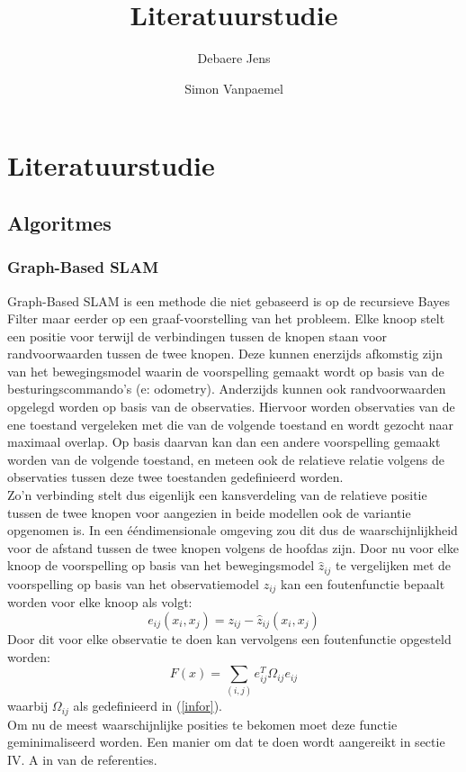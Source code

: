 \documentclass{book}
\title{Literatuurstudie}
\author{Debaere Jens \and Simon Vanpaemel}
\begin{document}
\chapter{Literatuurstudie}
\section{Algoritmes}
\subsection{Graph-Based SLAM}
Graph-Based SLAM is een methode die niet gebaseerd is op de recursieve Bayes Filter maar eerder op een graaf-voorstelling van het probleem. Elke knoop stelt een positie voor terwijl de verbindingen tussen de knopen staan voor randvoorwaarden tussen de twee knopen. Deze kunnen enerzijds afkomstig zijn van het bewegingsmodel waarin de voorspelling gemaakt wordt op basis van de besturingscommando's (e: odometry). Anderzijds kunnen ook randvoorwaarden opgelegd worden op basis van de observaties. Hiervoor worden observaties van de ene toestand vergeleken met die van de volgende toestand en wordt gezocht naar maximaal overlap. Op basis daarvan kan dan een andere voorspelling gemaakt worden van de volgende toestand, en meteen ook de relatieve relatie volgens de observaties tussen deze twee toestanden gedefinieerd worden.\\
Zo'n verbinding stelt dus eigenlijk een kansverdeling van de relatieve positie tussen de twee knopen voor aangezien in beide modellen ook de variantie opgenomen is. In een ééndimensionale omgeving zou dit dus de waarschijnlijkheid voor de afstand tussen de twee knopen volgens de hoofdas zijn. 
Door nu voor elke knoop de voorspelling op basis van het bewegingsmodel $\hat{z}_{ij}$ te vergelijken met de voorspelling op basis van het observatiemodel $z_{ij}$ kan een foutenfunctie bepaalt worden voor elke knoop als volgt:
\begin{equation}
e_{ij}(x_i,x_j) = z_{ij} - \hat{z}_{ij}(x_i,x_j)
\end{equation}
Door dit voor elke observatie te doen kan vervolgens een foutenfunctie opgesteld worden:
\begin{equation}
F(x) = \sum\limits_{(i,j)} e_{ij}^T \Omega_{ij} e_{ij}
\end{equation}
waarbij $\Omega_{ij}$ als gedefinieerd in (\ref{infor}).\\
Om nu de meest waarschijnlijke posities te bekomen moet deze functie geminimaliseerd worden. Een manier om dat te doen wordt aangereikt in sectie IV. A in \cite{graph} van de referenties.
\end{document}

